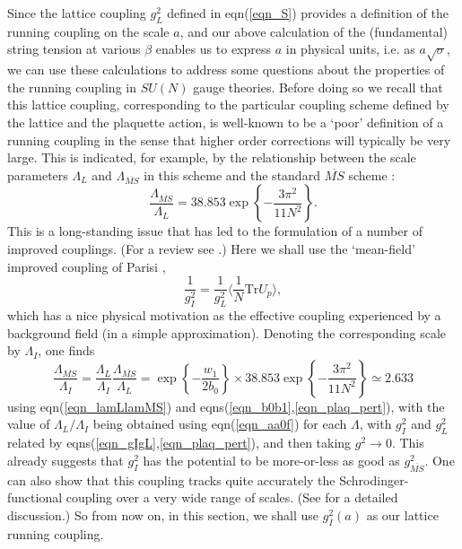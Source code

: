 \documentclass[12pt]{article}
\newcommand{\be}{\begin{equation}}
\newcommand{\ee}{\end{equation}}
\begin{document}
Since the lattice coupling $g^2_L$ defined in eqn(\ref{eqn_S}) provides a definition of the running coupling
on the scale $a$, and our above calculation of the (fundamental) string tension at various $\beta$ enables
us to express $a$ in physical units, i.e. as $a\surd\sigma$, we can use these calculations to address
some questions about the properties of the running coupling in $SU(N)$ gauge theories. Before doing so
we recall that this lattice coupling, corresponding to the particular coupling scheme defined by the lattice
and the plaquette action, is well-known to be a `poor' definition of a running coupling in the sense that
higher order corrections will typically be very large. This is indicated, for example, by the relationship
between the scale parameters $\Lambda_L$ and $\Lambda_{\overline{MS}}$ in this scheme and the
standard ${\overline{MS}}$ scheme 
%
\cite{Hasenfratz,Dashen-Gross}:
%
\begin{equation}
\frac{\Lambda_{\overline{MS}}}{\Lambda_L}
=
38.853 \exp\left\{-\frac{3\pi^2}{11N^2}\right\}.
\label{eqn_lamLlamMS}
\end{equation}
%
This is a long-standing issue that has led to the formulation of a number of improved couplings.
(For a review see
%
\cite{gimp_review}.)
%
Here we shall use the `mean-field' improved coupling of Parisi 
%
\cite{MF_Parisi},
%
\be
\frac{1}{g^2_I} = \frac{1}{g^2_L}
\langle \frac{1}{N}\mathrm{Tr}U_p \rangle,
\label{eqn_gI}
\ee
%
which has a nice physical motivation as the effective coupling experienced by a background field
(in a simple approximation). Denoting the corresponding scale by $\Lambda_I$, one finds
%
\be
\frac{\Lambda_{\overline{MS}}}{\Lambda_I}
=
\frac{\Lambda_L}{\Lambda_I}
\frac{\Lambda_{\overline{MS}}}{\Lambda_L}
=
\exp\left\{ -\frac{w_1}{2b_0} \right\}
\times
38.853 \exp\left\{-\frac{3\pi^2}{11N^2}\right\}
\simeq
2.633
\label{eqn_lamIlamMS}
\ee
%
using eqn(\ref{eqn_lamLlamMS}) and eqns(\ref{eqn_b0b1},\ref{eqn_plaq_pert}), with the
value of $\Lambda_L/\Lambda_I$ being obtained using eqn(\ref{eqn_aa0f}) for each $\Lambda$,
with $g^2_I$ and $g^2_L$ related by eqns(\ref{eqn_gIgL},\ref{eqn_plaq_pert}), and then
taking $g^2\to 0$. This already suggests that $g^2_I$ has the potential to be more-or-less
as good as $g^2_{\overline{MS}}$. One can also show
%
\cite{CAMTAT}
%
that this coupling tracks quite accurately the Schrodinger-functional coupling
%
\cite{SF1,SF2}
%
over a very wide range of scales. (See
%
\cite{CAMTAT}
%
for a detailed discussion.) So from now on, in this section, we shall use
$g^2_I(a)$ as our lattice running coupling.
\end{document}
